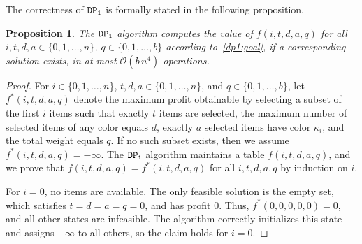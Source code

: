 \documentclass[preprint,11pt]{elsarticle}
\newcommand{\capacity}{b}
\newcommand{\firstDP}{{\tt DP_1}}
\newtheorem{proposition}{Proposition}
\theoremstyle{definition}
\begin{document}
\noindent The correctness of $\firstDP$ is formally stated in the following proposition.
\begin{proposition}
The $\firstDP$ algorithm computes the value of $f(i,t,d,a,q)$ for all $i,t,d,a \in \{0,1,\dots,n\}$, $q \in \{0,1,\dots, \capacity\}$ according to~\eqref{dp1:goal}, if a corresponding solution exists, in at most $\mathcal{O}(\capacity \, n^4)$ operations.
\end{proposition}
\begin{proof}
For $i \in \{0,1,\dots,n\}$, $t,d,a \in \{0,1,\dots,n\}$, and $q \in \{0,1,\dots,\capacity\}$, let $f^*(i,t,d,a,q)$ denote the maximum profit obtainable by selecting a subset of the first $i$ items such that exactly $t$ items are selected, the maximum number of selected items of any color equals $d$, exactly $a$ selected items have color $\kappa_i$, and the total weight equals $q$.
If no such subset exists, then we assume $f^*(i,t,d,a,q) = -\infty$.
The $\firstDP$ algorithm maintains a table $f(i,t,d,a,q)$, and we prove that $f(i,t,d,a,q) = f^*(i,t,d,a,q)$ for all $i,t,d,a,q$ by induction on $i$.

\smallskip

For $i=0$, no items are available. The only feasible solution is the empty set, which satisfies $t=d=a=q=0$, and has profit $0$. 
Thus, $f^*(0,0,0,0,0) = 0$, and all other states are infeasible. The algorithm correctly initializes this state and assigns $-\infty$ to all others, so the claim holds for $i=0$.

\smallskip


\end{proof}
\end{document}
